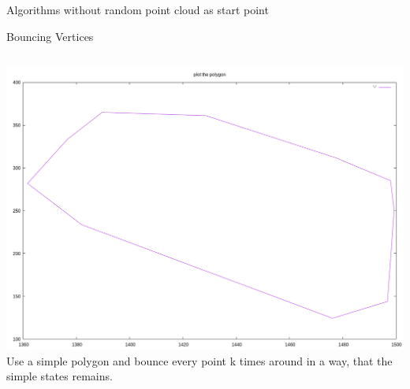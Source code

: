 \documentclass{beamer}
\begin{document}
\begin{frame}{}
  \centering \Large
  Algorithms without random point cloud as start point
\end{frame}

\begin{frame}{Bouncing Vertices}
  \begin{block}{}
    \begin{columns}[onlytextwidth,T]
      \column{\dimexpr\linewidth-40mm}
      \includegraphics[width=0.5\paperwidth]{figures/kk-bouncing-vertices-10-0-0.png}
      \column{40mm}
      Use a simple polygon and bounce every point k times around in a way, that
      the simple states remains.
    \end{columns}
  \end{block}
\end{frame}
\end{document}
